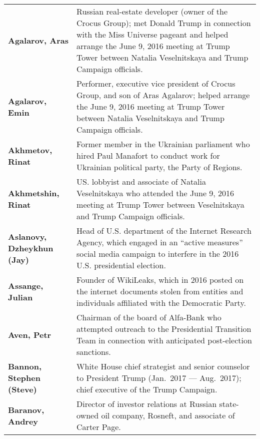 \begin{longtable}{ p{} p{} }

    \textbf{Agalarov, Aras} & Russian real-estate developer (owner of the Crocus Group); met Donald Trump in connection with the Miss Universe pageant and helped arrange the June 9, 2016 meeting at Trump Tower between Natalia Veselnitskaya and Trump Campaign officials. \\

    \textbf{Agalarov, Emin} & Performer, executive vice president of Crocus Group, and son of Aras Agalarov; helped arrange the June 9, 2016 meeting at Trump Tower between Natalia Veselnitskaya and Trump Campaign officials. \\

    \textbf{Akhmetov, Rinat} & Former member in the Ukrainian parliament who hired Paul Manafort to conduct work for Ukrainian political party, the Party of Regions. \\

    \textbf{Akhmetshin, Rinat} & US. lobbyist and associate of Natalia Veselnitskaya who attended the June 9, 2016 meeting at Trump Tower between Veselnitskaya and Trump Campaign officials. \\

    \textbf{Aslanovy, Dzheykhun (Jay)} & Head of U.S. department of the Internet Research Agency, which engaged in an “active measures” social media campaign to interfere in the 2016 U.S. presidential election. \\

    \textbf{Assange, Julian} & Founder of WikiLeaks, which in 2016 posted on the internet documents stolen from entities and individuals affiliated with the Democratic Party. \\

    \textbf{Aven, Petr} & Chairman of the board of Alfa-Bank who attempted outreach to the Presidential Transition Team in connection with anticipated post-election sanctions. \\

    \textbf{Bannon, Stephen (Steve)} & White House chief strategist and senior counselor to President Trump (Jan.~2017 — Aug.~2017); chief executive of the Trump Campaign. \\

    \textbf{Baranov, Andrey} & Director of investor relations at Russian state-owned oil company, Rosneft, and associate of Carter Page. \\


\end{longtable}
